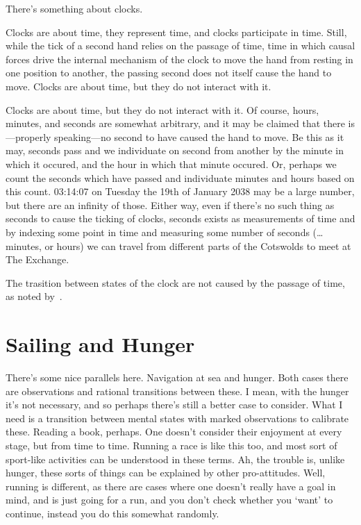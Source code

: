 \documentclass[10pt]{article}
\begin{document}
There's something about clocks.

Clocks are about time, they represent time, and clocks participate in time.
Still, while the tick of a second hand relies on the passage of time, time in which causal forces drive the internal mechanism of the clock to move the hand from resting in one position to another, the passing second does not itself cause the hand to move.
Clocks are about time, but they do not interact with it.

Clocks are about time, but they do not interact with it.
Of course, hours, minutes, and seconds are somewhat arbitrary, and it may be claimed that there is---properly speaking---no second to have caused the hand to move.
Be this as it may, seconds pass and we individuate on second from another by the minute in which it occured, and the hour in which that minute occured.
Or, perhaps we count the seconds which have passed and individuate minutes and hours based on this count.
03:14:07 on Tuesday the 19th of January 2038 may be a large number, but there are an infinity of those.
Either way, even if there's no such thing as seconds to cause the ticking of clocks, seconds exists as measurements of time and by indexing some point in time and measuring some number of seconds (\dots minutes, or hours) we can travel from different parts of the Cotswolds to meet at The Exchange.

The trasition between states of the clock are not caused by the passage of time, as noted by~\textcite{Smith:1988aa}.

\section{Sailing and Hunger}
\label{sec:sailing-hunger}

There's some nice parallels here.
Navigation at sea and hunger.
Both cases there are observations and rational transitions between these.
I mean, with the hunger it's not necessary, and so perhaps there's still a better case to consider.
What I need is a transition between mental states with marked observations to calibrate these.
Reading a book, perhaps.
One doesn't consider their enjoyment at every stage, but from time to time.
Running a race is like this too, and most sort of sport-like activities can be understood in these terms.
Ah, the trouble is, unlike hunger, these sorts of things can be explained by other pro-attitudes.
Well, running is different, as there are cases where one doesn't really have a goal in mind, and is just going for a run, and you don't check whether you `want' to continue, instead you do this somewhat randomly.
\end{document}
